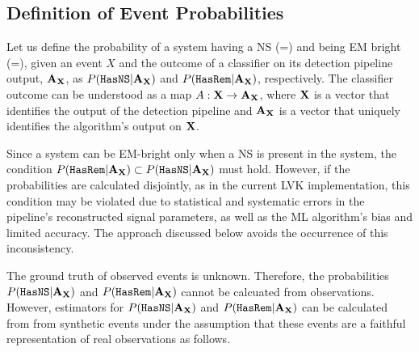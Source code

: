 \subsection*{Definition of Event Probabilities}

Let us define the probability of a system having a \ac{NS} (\hasns=\true) and being \ac{EM} bright (\hasrem=\true), given an event $X$ and the outcome of a classifier on its detection pipeline
output, ${\bf A}_{\bf X}$, as $P({{\tt HasNS}}|{\bf A}_{\bf X})$ and $P({{\tt HasRem}}|{\bf A}_{\bf X})$, respectively. The classifier outcome can be understood as a map $A:{\bf X}\to {\bf A}_{\bf X}$, where
$\bf X$ is a vector that identifies the output of the detection pipeline and ${\bf A}_{\bf X}$ is a vector that uniquely identifies the algorithm's output on $\bf X$. 

Since a system can be EM-bright only when a \ac{NS} is present in the system, the condition $P({{\tt HasRem}}|{\bf A}_{\bf X})\subset P({{\tt HasNS}}|{\bf A}_{\bf X})$ must hold. However, if the probabilities
are calculated disjointly, as in the current \ac{LVK} implementation, this condition may be violated due to statistical and systematic errors in the pipeline's reconstructed signal parameters, as
well as the \ac{ML} algorithm's bias and limited accuracy. The approach discussed below avoids the occurrence of this inconsistency.

The ground truth of observed events is unknown. Therefore, the probabilities $P({{\tt HasNS}}|{\bf A}_{\bf X})$ and $P({{\tt HasRem}}|{\bf A}_{\bf X})$ cannot be calcuated from observations. However,
estimators for $P({{\tt HasNS}}|{\bf A}_{\bf X})$ and $P({{\tt HasRem}}|{\bf A}_{\bf X})$ can be calculated from from synthetic events under the assumption that these events are a faithful representation of
real observations as follows.

